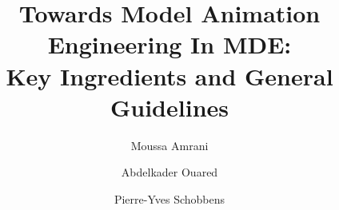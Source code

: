 \documentclass[sigconf%
]{acmart}
\begin{document}
\title[Towards Model Animation Engineering In MDE]
{Towards Model Animation Engineering In MDE:\\ Key Ingredients and General Guidelines}
\author{Moussa Amrani}
\author{Abdelkader Ouared}
\author{Pierre-Yves Schobbens}

\renewcommand{\shortauthors}{Amrani, Ouared and Schobbens}

\maketitle





\balance


\end{document}
